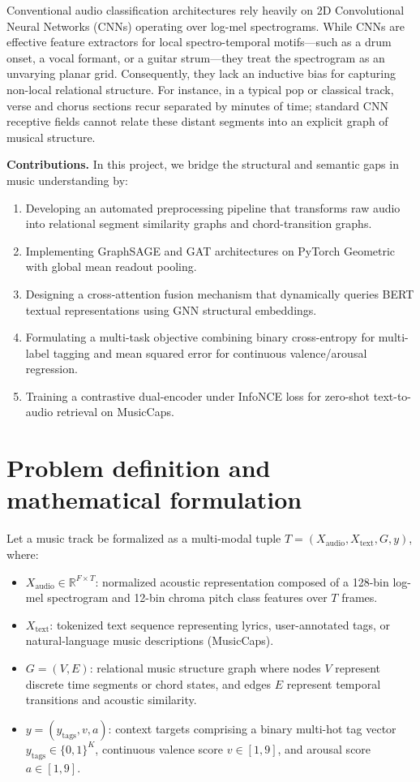 \documentclass[10pt]{article}
\begin{document}
Conventional audio classification architectures rely heavily on 2D Convolutional Neural Networks (CNNs) operating over log-mel spectrograms. While CNNs are effective feature extractors for local spectro-temporal motifs---such as a drum onset, a vocal formant, or a guitar strum---they treat the spectrogram as an unvarying planar grid. Consequently, they lack an inductive bias for capturing non-local relational structure. For instance, in a typical pop or classical track, verse and chorus sections recur separated by minutes of time; standard CNN receptive fields cannot relate these distant segments into an explicit graph of musical structure.

\textbf{Contributions.} In this project, we bridge the structural and semantic gaps in music understanding by:
\begin{enumerate}[nosep]
  \item Developing an automated preprocessing pipeline that transforms raw audio into relational segment similarity graphs and chord-transition graphs.
  \item Implementing GraphSAGE and GAT architectures on PyTorch Geometric with global mean readout pooling.
  \item Designing a cross-attention fusion mechanism that dynamically queries BERT textual representations using GNN structural embeddings.
  \item Formulating a multi-task objective combining binary cross-entropy for multi-label tagging and mean squared error for continuous valence/arousal regression.
  \item Training a contrastive dual-encoder under InfoNCE loss for zero-shot text-to-audio retrieval on MusicCaps.
\end{enumerate}

\section{Problem definition and mathematical formulation}

Let a music track be formalized as a multi-modal tuple $T = (X_{\text{audio}}, X_{\text{text}}, G, y)$, where:
\begin{itemize}[nosep]
  \item $X_{\text{audio}} \in \mathbb{R}^{F \times T}$: normalized acoustic representation composed of a 128-bin log-mel spectrogram and 12-bin chroma pitch class features over $T$ frames.
  \item $X_{\text{text}}$: tokenized text sequence representing lyrics, user-annotated tags, or natural-language music descriptions (MusicCaps).
  \item $G = (V, E)$: relational music structure graph where nodes $V$ represent discrete time segments or chord states, and edges $E$ represent temporal transitions and acoustic similarity.
  \item $y = (y_{\text{tags}}, v, a)$: context targets comprising a binary multi-hot tag vector $y_{\text{tags}} \in \{0,1\}^K$, continuous valence score $v \in [1,9]$, and arousal score $a \in [1,9]$.
\end{itemize}
\end{document}
